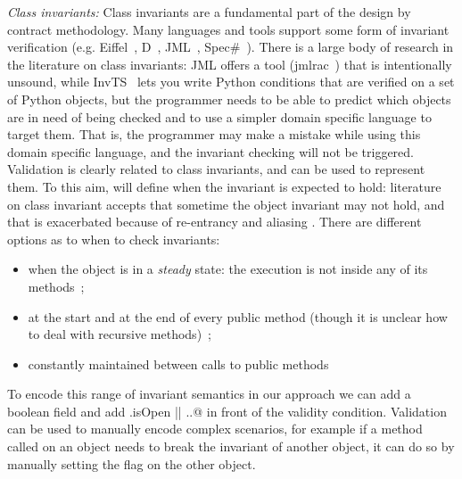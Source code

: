 \noindent\textit{Class invariants:}
Class invariants are a fundamental part of the design by contract methodology. 
Many languages and tools support some form of invariant verification (e.g. Eiffel~\cite{Meyer:1992:EL:129093}, D~\cite{Alexandrescu:2010:DPL:1875434}, JML~\cite{Burdy2005}, Spec\#~\cite{Barnett:2004:SPS:2131546.2131549}).
There is a large body of research in the literature on class invariants:
JML offers a tool (jmlrac~\cite{Burdy2005}) that is intentionally unsound,
while InvTS~\cite{gorbovitski08efficient} lets you write Python conditions
 that are verified on a set of Python objects, but the programmer needs to be able
 to predict which objects are in need of being checked and to use a simpler domain
 specific language to target them. That is, the programmer may make a mistake
while using this domain specific language, and the invariant checking
will not be triggered.
Validation is clearly related to class invariants, and can be used to represent them.
To this aim, \validate{} will define when the invariant is expected to hold:
literature on class invariant accepts that sometime the object invariant may not hold,
and that is exacerbated because of re-entrancy and aliasing
\cite{leino2004object,drossopoulou2008unified}.
There are different options as to when to check invariants:
\begin{itemize}
\item  when the object is in a \textit{steady} state:
 the execution is not inside any of its methods~\cite{Gopinathan:2008:RMO:1483018.1483028};
\item
at the start and at the end of every public method
(though it is unclear how to deal with recursive methods)~\cite{Burdy2005};
\item
constantly maintained between calls to public methods~\cite{WikiInvariant}
\end{itemize}
To encode this range of invariant semantics
in our approach we can add a boolean \Q@isOpen@ field and add \Q@this.isOpen || ..@
in front of the validity condition.
Validation can be used to manually encode complex scenarios,
for example if a method called on an object needs to break the invariant of another object,
it can do so by manually setting the \Q@isOpen@ flag on the other object.


